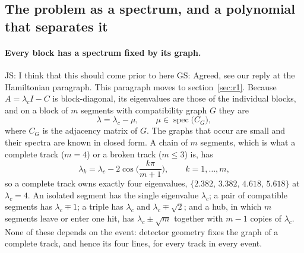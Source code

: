 \documentclass[11pt,a4paper]{article}
\newcommand{\js}[1]{{\color{blue} JS: #1 }}
\newcommand{\gs}[1]{{\color{orange!85!black} GS: #1 }}
\begin{document}
\subsection{The problem as a spectrum, and a polynomial that separates it}\label{sec:r2}

\paragraph{Every block has a spectrum fixed by its graph.}
\js{I think that this should come prior to here} \gs{Agreed, see our reply at the Hamiltonian paragraph. This paragraph moves to section~\ref{sec:r1}.}
Because $A=\lambda_cI-C$ is block-diagonal, its eigenvalues are those of the individual blocks, and
on a block of $m$ segments with compatibility graph $G$ they are
\begin{equation}
\lambda=\lambda_c-\mu,\qquad \mu\in\operatorname{spec}\big(C_G\big),
\end{equation}
where $C_G$ is the adjacency matrix of $G$. The graphs that occur are small and their spectra are
known in closed form. A chain of $m$ segments, which is what a complete track ($m=4$) or a broken
track ($m\le3$) is, has
\begin{equation}
\lambda_k=\lambda_c-2\cos\!\Big(\frac{k\pi}{m+1}\Big),\qquad k=1,\dots,m ,
\end{equation}
so a complete track owns exactly four eigenvalues, $\{2.382,\,3.382,\,4.618,\,5.618\}$ at
$\lambda_c=4$. An isolated segment has the single eigenvalue $\lambda_c$; a pair of compatible
segments has $\lambda_c\mp1$; a triple has $\lambda_c$ and $\lambda_c\mp\sqrt2$; and a hub, in which
$m$ segments leave or enter one hit, has $\lambda_c\pm\sqrt m$ together with $m-1$ copies of
$\lambda_c$. None of these depends on the event: detector geometry fixes the graph of a complete
track, and hence its four lines, for every track in every event.
\end{document}
